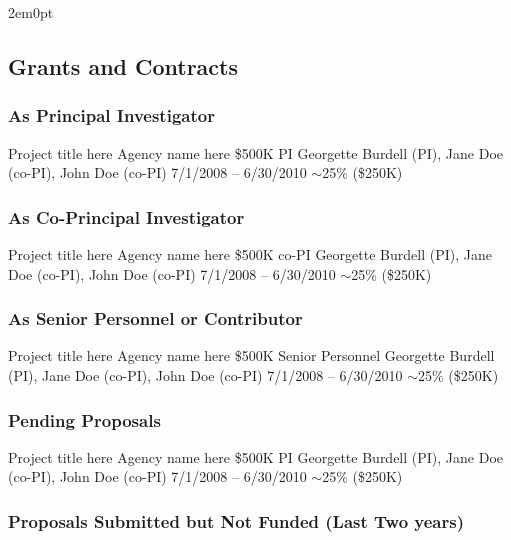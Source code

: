\documentclass[11pt]{article}
\begin{document}
\begin{adjustwidth}{2em}{0pt}
\subsection{Grants and Contracts}

\subsubsection{As Principal Investigator}

\grantentry
    {Project title here}
    {Agency name here}
    {\$500K}
    {PI}
    {Georgette Burdell (PI), Jane Doe (co-PI), John Doe (co-PI)}
    {7/1/2008 -- 6/30/2010}
    {$\sim$25\% (\$250K)}

\subsubsection{As Co-Principal Investigator}

\grantentry
    {Project title here}
    {Agency name here}
    {\$500K}
    {co-PI}
    {Georgette Burdell (PI), Jane Doe (co-PI), John Doe (co-PI)}
    {7/1/2008 -- 6/30/2010}
    {$\sim$25\% (\$250K)}

\subsubsection{As Senior Personnel or Contributor}

\grantentry
    {Project title here}
    {Agency name here}
    {\$500K}
    {Senior Personnel}
    {Georgette Burdell (PI), Jane Doe (co-PI), John Doe (co-PI)}
    {7/1/2008 -- 6/30/2010}
    {$\sim$25\% (\$250K)}

\subsubsection{Pending Proposals}

\grantentry
    {Project title here}
    {Agency name here}
    {\$500K}
    {PI}
    {Georgette Burdell (PI), Jane Doe (co-PI), John Doe (co-PI)}
    {7/1/2008 -- 6/30/2010}
    {$\sim$25\% (\$250K)}

\subsubsection{Proposals Submitted but Not Funded (Last Two years)}


\end{adjustwidth}
\end{document}
